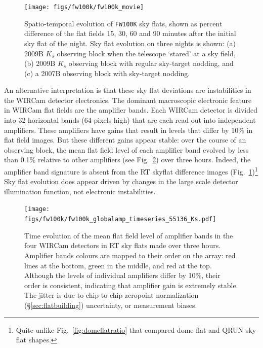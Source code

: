 \documentclass[iop]{emulateapj}
\newcommand{\Fig}[1]{Fig.~\ref{fig:#1}}  %
\newcommand{\Sec}[1]{\S\ref{sec:#1}}  %
\begin{document}
\begin{figure}[t]
\centering
\texttt{[image: figs/fw100k/fw100k\_movie]}
\caption{Spatio-temporal evolution of \texttt{FW100K} sky flats, shown as percent difference of the flat fields 15, 30, 60 and 90 minutes after the initial sky flat of the night. Sky flat evolution on three nights is shown: (a) 2009B $K_s$ observing block when the telescope `stared' at a sky field, (b) 2009B $K_s$ observing block with regular sky-target nodding, and (c) a 2007B observing block with sky-target nodding.}
\label{fig:fw100k_movie}
\end{figure}

An alternative interpretation is that these sky flat deviations are instabilities in the WIRCam detector electronics.
The dominant macroscopic electronic feature in WIRCam flat fields are the amplifier bands.
Each WIRCam detector is divided into 32 horizontal bands (64 pixels high) that are each read out into independent amplifiers.
These amplifiers have gains that result in levels that differ by 10\% in flat field images.
But these different gains appear stable: over the course of an observing block, the mean flat field level of each amplifier band evolved by less than 0.1\% relative to other amplifiers (see \Fig{fw100k_globalamp_timeseries_55136_Ks}) over three hours.
Indeed, the amplifier band signature is absent from the RT skyflat difference images (\Fig{fw100k_movie})\footnote{Quite unlike \Fig{domeflatratio} that compared dome flat and QRUN sky flat shapes.}
Sky flat evolution does appear driven by changes in the large scale detector illumination function, not electronic instabilities.

\begin{figure}[t]
\centering
\texttt{[image: figs/fw100k/fw100k\_globalamp\_timeseries\_55136\_Ks.pdf]}
\caption{Time evolution of the mean flat field level of amplifier bands in the four WIRCam detectors in RT sky flats made over three hours. Amplifier bands colours are mapped to their order on the array: red lines at the bottom, green in the middle, and red at the top. Although the levels of individual amplifiers differ by 10\%, their order is consistent, indicating that amplifier gain is extremely stable. The jitter is due to chip-to-chip zeropoint normalization (\Sec{flatbuilding}) uncertainty, or measurement biases.}
\label{fig:fw100k_globalamp_timeseries_55136_Ks}
\end{figure}
\end{document}
